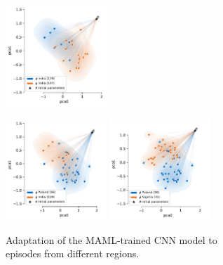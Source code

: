 
	\begin{figure}
	\centering
	
		\begin{subfigure}[t]{\linewidth}
			\includegraphics[width=3.8cm]{figures/sen12ms-adaptation/129-147}
			
			\includegraphics[width=3.8cm]{figures/sen12ms-adaptation/56-129}
			\includegraphics[width=3.8cm]{figures/sen12ms-adaptation/56-31}
			\caption{Adaptation of the MAML-trained CNN model to episodes from different regions.}
		\end{subfigure}
		
		
		\begin{subfigure}[t]{\linewidth}
			\begin{tikzpicture}
			

\end{tikzpicture}
\end{subfigure}
\end{figure}

